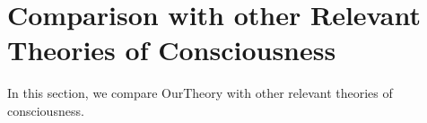 \documentclass[utf8]{article}
\begin{document}
        
        
    
    
    \section{Comparison with other Relevant Theories of Consciousness}\label{sec:Comparison with other theories}
    In this section, we compare \ac{OurTheory} with other relevant theories of consciousness.
	
\end{document}
